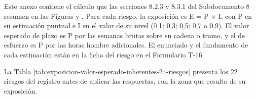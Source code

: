 \documentclass[anexo]{../../comun/overfore}
\begin{document}
Este anexo contiene el cálculo que las secciones 8.2.3 y 8.3.1 del Subdocumento 8 resumen en las Figuras  y . Para cada riesgo, la exposición es E = P × I, con P en su estimación puntual e I en el valor de su nivel (0,1; 0,3; 0,5; 0,7 o 0,9). El valor esperado de plazo es P por las semanas brutas sobre su cadena o tramo, y el de esfuerzo es P por las horas hombre adicionales. El enunciado y el fundamento de cada estimación están en la ficha del riesgo en el Formulario T-16.

La Tabla \ref{tab:exposicion-valor-esperado-inherentes-24-riesgos} presenta los 22 riesgos del registro antes de aplicar las respuestas, con la zona que resulta de su exposición.
\end{document}

